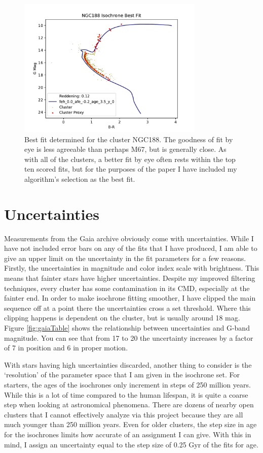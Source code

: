 \documentclass[aps,prb,twocolumn,groupedaddress,nofootinbib,floatfix]{revtex4-1}
\begin{document}
\begin{figure}[!h]
	\centering
      \includegraphics[width=3.5in]{NGC188_CMD_Iso_BestFit.pdf}
	\caption{Best fit determined for the cluster NGC188. The goodness of fit by eye is less agreeable than perhaps M67, but is generally close. As with all of the clusters, a better fit by eye often rests within the top ten scored fits, but for the purposes of the paper I have included my algorithm's selection as the best fit.}
	\label{fig:NGC188_iso_best_fit}
\end{figure}  

\section*{Uncertainties}
Measurements from the Gaia archive obviously come with uncertainties. While I have not included error bars on any of the fits that I have produced, I am able to give an upper limit on the uncertainty in the fit parameters for a few reasons. Firstly, the uncertainties in magnitude and color index scale with brightness. This means that fainter stars have higher uncertainties. Despite my improved filtering techniques, every cluster has some contamination in its CMD, especially at the fainter end. In order to make isochrone fitting smoother, I have clipped the main sequence off at a point there the uncertainties cross a set threshold. Where this clipping happens is dependent on the cluster, but is usually around 18 mag. Figure \ref{fig:gaiaTable} shows the relationship between uncertainties and G-band magnitude. You can see that from 17 to 20 the uncertainty increases by a factor of 7 in position and 6 in proper motion.

With stars having high uncertainties discarded, another thing to consider is the `resolution' of the parameter space that I am given in the isochrone set. For starters, the ages of the isochrones only increment in steps of 250 million years. While this is a lot of time compared to the human lifespan, it is quite a coarse step when looking at astronomical phenomena. There are dozens of nearby open clusters that I cannot effectively analyze via this project because they are all much younger than 250 million years. Even for older clusters, the step size in age for the isochrones limits how accurate of an assignment I can give. With this in mind, I assign an uncertainty equal to the step size of 0.25 Gyr of the fits for age.
\end{document}

